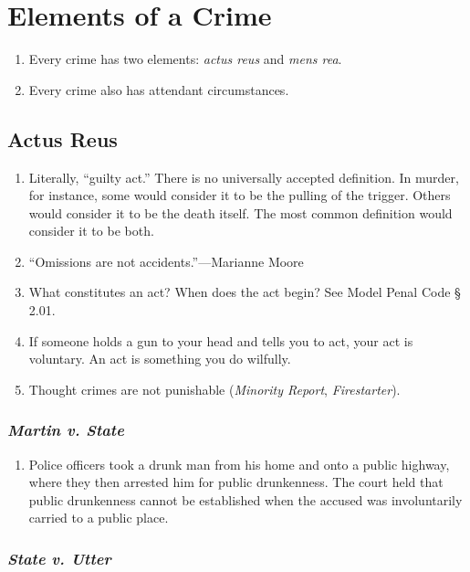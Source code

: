 \section{Elements of a Crime}

\begin{enumerate}
    \item Every crime has two elements: \emph{actus reus} and \emph{mens rea}.
    \item Every crime also has attendant circumstances.
\end{enumerate}

\subsection{Actus Reus}

\begin{enumerate}
    \item Literally, ``guilty act.'' There is no universally accepted definition. In murder, for instance, some would consider it to be the pulling of the trigger. Others would consider it to be the death itself. The most common definition would consider it to be both.
    \item ``Omissions are not accidents.''---Marianne Moore
    \item What constitutes an act? When does the act begin? See Model Penal Code § 2.01.
    \item If someone holds a gun to your head and tells you to act, your act is voluntary. An act is something you do wilfully.
    \item Thought crimes are not punishable (\emph{Minority Report}, \emph{Firestarter}).
\end{enumerate}

\subsubsection{\emph{Martin v. State}}

\begin{enumerate}
    \item Police officers took a drunk man from his home and onto a public highway, where they then arrested him for public drunkenness. The court held that public drunkenness cannot be established when the accused was involuntarily carried to a public place.
\end{enumerate}

\subsubsection{\emph{State v. Utter}}

